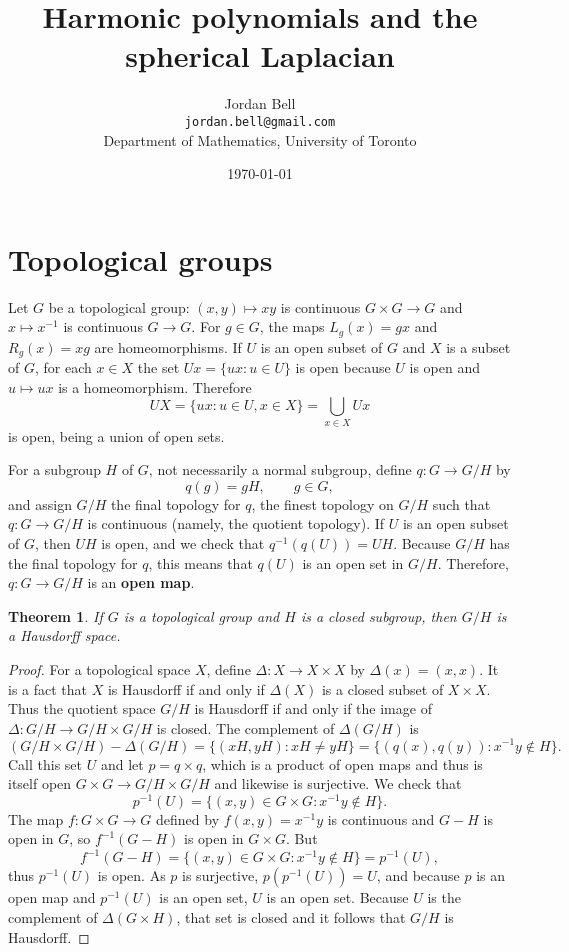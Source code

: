 \documentclass{article}
\newtheorem{theorem}{Theorem}
\theoremstyle{definition}
\begin{document}
\title{Harmonic polynomials and the spherical Laplacian}
\author{Jordan Bell\\ \texttt{jordan.bell@gmail.com}\\Department of Mathematics, University of Toronto}
\date{\today}

\maketitle

\section{Topological groups}
\label{topologicalgroups}
Let $G$ be a topological group: $(x,y)  \mapsto xy$ is continuous $G \times G \to G$ and $x \mapsto x^{-1}$ is continuous $G \to G$.
For $g \in G$, the maps $L_g(x)=gx$ and $R_g(x)=xg$ are homeomorphisms. 
If $U$ is an open subset of $G$ and  $X$ is a subset of $G$, for each $x \in X$ the set $Ux=\{ux:u \in U\}$ is open because $U$ is
open and $u \mapsto ux$ is a homeomorphism. Therefore
\[
UX =\{ux: u\in U, x \in X\}= \bigcup_{x \in X} Ux
\]
is open, being a union of open sets. 

For a subgroup $H$ of $G$, not necessarily a normal subgroup, define 
$q:G \to G/H$ by 
\[
q(g) = gH,\qquad g \in G,
\]
and assign $G/H$ the final topology for $q$,
the finest topology on $G/H$ such that $q:G \to G/H$ is continuous (namely, the quotient
topology). 
If $U$ is an open subset of $G$, then $UH$ is open, and we check that
$q^{-1}(q(U)) = UH$. Because 
$G/H$ has the final topology for $q$, 
this means that $q(U)$ is an open set in $G/H$. Therefore, $q:G \to G/H$ is an \textbf{open map}. 

\begin{theorem}
If $G$ is a topological group and $H$ is a closed subgroup, then $G/H$ is a Hausdorff space.
\end{theorem}
\begin{proof}
For  a topological space $X$,  define $\Delta:X \to X \times X$ by $\Delta(x)=(x,x)$. 
It is a fact that $X$ is Hausdorff if and only if $\Delta(X)$ is a closed subset of $X \times X$. Thus
the quotient space $G/H$ is Hausdorff if and only if 
the image of $\Delta:G/H \to G/H \times G/H$ is closed. The complement of $\Delta(G/H)$ is
\[
(G/H \times G/H) - \Delta(G/H)
=\{(xH,yH) : xH \neq yH\}
=\{(q(x),q(y))  : x^{-1}y \not \in H\}.
\]
Call this set $U$ and let $p=q \times q$, which is a product of open maps and thus is itself open $G \times G 
\to G/H \times G/H$ and likewise is surjective. 
We check that 
\[
p^{-1}(U) = \{(x,y) \in G \times G: x^{-1} y \not \in H\}.
\]
The map $f:G \times G \to G$ defined by $f(x,y) = x^{-1}y$ is continuous and $G - H$ is open in $G$, so $f^{-1}(G - H)$
is open in $G \times G$. But
\[
f^{-1}(G - H) = \{(x,y) \in G \times G: x^{-1}y \not \in H\} = p^{-1}(U),
\]
thus $p^{-1}(U)$ is open. 
As $p$ is surjective, $p(p^{-1}(U))=U$, and because $p$ is an open map and $p^{-1}(U)$ is an open
set, $U$ is an open set. Because $U$ is the complement of $\Delta(G \times H)$, that set is closed and it follows
that $G/H$ is Hausdorff. 
\end{proof}
\end{document}
